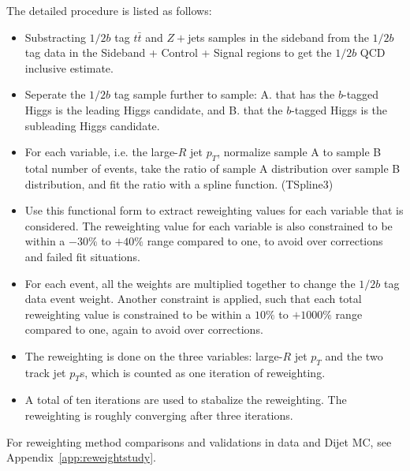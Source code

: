 \clearpage{}
The detailed procedure is listed as follows:
\begin{itemize}
\item Substracting $1/2b$ tag $t\bar{t}$ and $Z+$jets samples in the sideband from the $1/2b$ tag data in the Sideband + Control + Signal regions to get the $1/2b$ QCD inclusive estimate.
\item Seperate the $1/2b$ tag sample further to sample: A. that has the $b$-tagged Higgs is the leading \pt Higgs candidate, and B. that the $b$-tagged Higgs is the subleading \pt Higgs candidate.
\item For each variable, i.e. the large-$R$ jet $p_{T}$, normalize sample A to sample B total number of events, take the ratio of sample A distribution over sample B distribution, and fit the ratio with a spline function. (TSpline3)
\item Use this functional form to extract reweighting values for each variable that is considered. The reweighting value for each variable is also constrained to be within a $-30\%$ to $+40\%$ range compared to one, to avoid over corrections and failed fit situations. 
\item For each event, all the weights are multiplied together to change the $1/2b$ tag data event weight. Another constraint is applied, such that each total reweighting value is constrained to be within a $10\%$ to $+1000\%$ range compared to one, again to avoid over corrections.
\item The reweighting is done on the three variables: large-$R$ jet $p_{T}$ and the two track jet $p_{T}$s, which is counted as one iteration of reweighting.
\item A total of ten iterations are used to stabalize the reweighting. The reweighting is roughly converging after three iterations.
\end{itemize}

For reweighting method comparisons and validations in data and Dijet MC, see Appendix~\ref{app:reweightstudy}.

